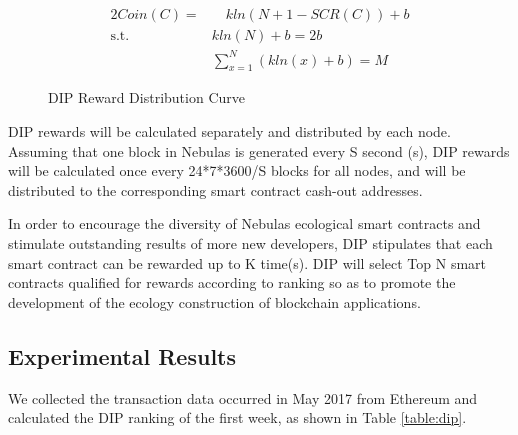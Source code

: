 \begin{alignat}{2}
Coin(C) = & \quad kln(N+1-SCR(C))+b \label{formula:dip} \\
\mbox{s.t.}\quad & kln(N) + b = 2b \nonumber \\
& \sum_{x=1}^{N}(kln(x) + b) = M \nonumber
\end{alignat}

\begin{figure}[h]
\centering
{}
\caption{DIP Reward Distribution Curve}
\label{fig:dipdis}
\end{figure}

DIP rewards will be calculated separately and distributed by each node. Assuming that one block in Nebulas is generated every S second (s),
DIP rewards will be calculated once every 24*7*3600/S blocks for all nodes, and will be distributed to the corresponding smart contract cash-out addresses.

In order to encourage the diversity of Nebulas ecological smart contracts and stimulate outstanding results of more new developers, DIP stipulates that each smart contract can be rewarded up to K time(s). DIP will select Top N smart contracts qualified for rewards according to ranking so as to promote the development of the ecology construction of blockchain applications.

\subsection{Experimental Results}
\label{dip:economic}

We collected the transaction data occurred in May 2017 from Ethereum and calculated the DIP ranking of the first week, as shown in Table \ref{table:dip}.

